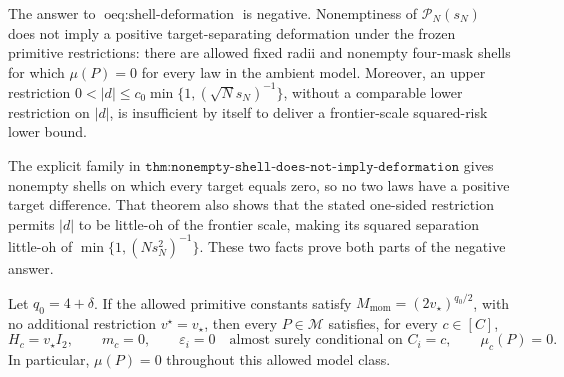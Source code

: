 The answer to \(\operatorname{oeq:shell\text{-}deformation}\) is negative. Nonemptiness of \(\mathcal P_N(s_N)\) does not imply a positive target-separating deformation under the frozen primitive restrictions: there are allowed fixed radii and nonempty four-mask shells for which \(\mu(P)=0\) for every law in the ambient model. Moreover, an upper restriction \(0<|d|\leq c_0\min\{1,(\sqrt N s_N)^{-1}\}\), without a comparable lower restriction on \(|d|\), is insufficient by itself to deliver a frontier-scale squared-risk lower bound.

The explicit family in \(\texttt{thm:nonempty-shell-does-not-imply-deformation}\) gives nonempty shells on which every target equals zero, so no two laws have a positive target difference. That theorem also shows that the stated one-sided restriction permits \(|d|\) to be little-oh of the frontier scale, making its squared separation little-oh of \(\min\{1,(Ns_N^2)^{-1}\}\). These two facts prove both parts of the negative answer.

Let \(q_0=4+\delta\). If the allowed primitive constants satisfy \(M_{\mathrm{mom}}=(2v_\star)^{q_0/2}\), with no additional restriction \(v^{\star}=v_\star\), then every \(P\in\mathcal M\) satisfies, for every \(c\in[C]\),
\[
H_c=v_\star I_2,
\qquad
m_c=0,
\qquad
\varepsilon_i=0\quad\text{almost surely conditional on }C_i=c,
\qquad
\mu_c(P)=0.
\]
In particular, \(\mu(P)=0\) throughout this allowed model class.

